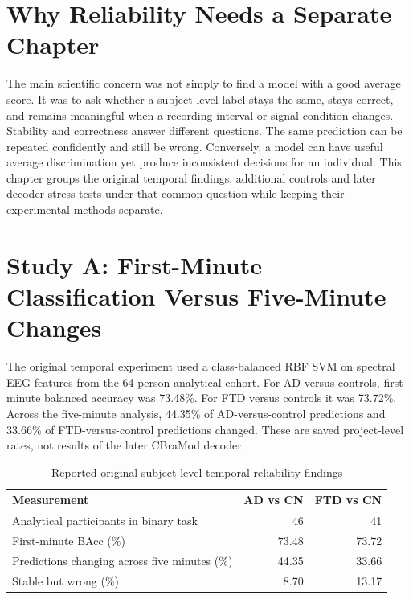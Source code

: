 \section{Why Reliability Needs a Separate Chapter}
The main scientific concern was not simply to find a model with a good average score. It was to ask whether a subject-level label stays the same, stays correct, and remains meaningful when a recording interval or signal condition changes. Stability and correctness answer different questions. The same prediction can be repeated confidently and still be wrong. Conversely, a model can have useful average discrimination yet produce inconsistent decisions for an individual. This chapter groups the original temporal findings, additional controls and later decoder stress tests under that common question while keeping their experimental methods separate.

\section{Study A: First-Minute Classification Versus Five-Minute Changes}
The original temporal experiment used a class-balanced RBF SVM on spectral EEG features from the 64-person analytical cohort. For AD versus controls, first-minute balanced accuracy was 73.48\%. For FTD versus controls it was 73.72\%. Across the five-minute analysis, 44.35\% of AD-versus-control predictions and 33.66\% of FTD-versus-control predictions changed. These are saved project-level rates, not results of the later CBraMod decoder.

\begin{table}[htbp]\centering\small
\caption{Reported original subject-level temporal-reliability findings}\label{tab:temporal}
\begin{tabular}{@{}lrr@{}}\toprule
\textbf{Measurement}&\textbf{AD vs CN}&\textbf{FTD vs CN}\\\midrule
Analytical participants in binary task&46&41\\
First-minute BAcc (\%)&73.48&73.72\\
Predictions changing across five minutes (\%)&44.35&33.66\\
Stable but wrong (\%)&8.70&13.17\\\bottomrule\end{tabular}\end{table}


